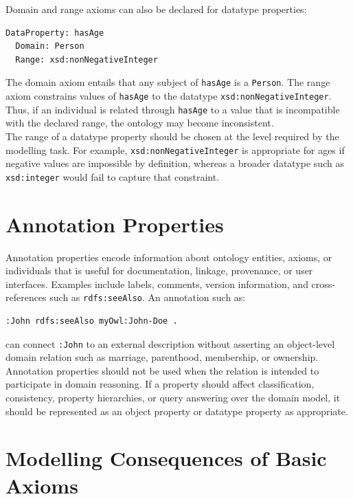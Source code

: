 \documentclass{scrbook}
\begin{document}
	Domain and range axioms can also be declared for datatype properties:
	\begin{lstlisting}
DataProperty: hasAge
  Domain: Person
  Range: xsd:nonNegativeInteger
	\end{lstlisting}
	
	The domain axiom entails that any subject of \texttt{hasAge} is a \texttt{Person}. The range axiom constrains values of \texttt{hasAge} to the datatype \texttt{xsd:nonNegativeInteger}. Thus, if an individual is related through \texttt{hasAge} to a value that is incompatible with the declared range, the ontology may become inconsistent.\\
	
	The range of a datatype property should be chosen at the level required by the modelling task. For example, \texttt{xsd:nonNegativeInteger} is appropriate for ages if negative values are impossible by definition, whereas a broader datatype such as \texttt{xsd:integer} would fail to capture that constraint.
	
	\section{Annotation Properties}
	
	Annotation properties encode information about ontology entities, axioms, or individuals that is useful for documentation, linkage, provenance, or user interfaces. Examples include labels, comments, version information, and cross-references such as \texttt{rdfs:seeAlso}. An annotation such as:
	\begin{lstlisting}
:John rdfs:seeAlso myOwl:John-Doe .
	\end{lstlisting}
	can connect \texttt{:John} to an external description without asserting an object-level domain relation such as marriage, parenthood, membership, or ownership.\\
	
	Annotation properties should not be used when the relation is intended to participate in domain reasoning. If a property should affect classification, consistency, property hierarchies, or query answering over the domain model, it should be represented as an object property or datatype property as appropriate.
	
	\section{Modelling Consequences of Basic Axioms}
	
\end{document}
